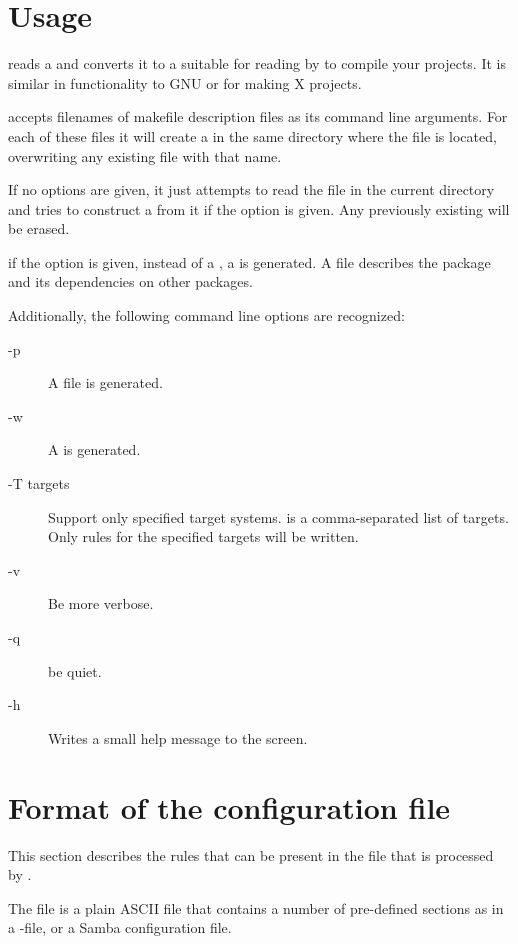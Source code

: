 \section{Usage}
 reads a  and converts it to a
 suitable for reading by \gnu {}
to compile your projects. It is similar in functionality to GNU
 or  for making X projects.

\fpcmake{} accepts filenames of makefile description files
as its command line arguments. For each of these files it will
create a  in the same directory where the file is
located, overwriting any existing file with that name.

If no options are given, it just attempts to read the file
 in the current directory and tries to
construct a  from it if the  option is
given. Any previously existing  will be erased.

if the  option is given, instead of a , a
 is generated. A  file describes the
package and its dependencies on other packages.

Additionally, the following command line options are recognized:
\begin{description}
\item[-p] A  file is generated.
\item[-w] A  is generated.
\item[-T targets] Support only specified target systems.  is a
comma-separated list of targets. Only rules for the specified targets
will be written.
\item[-v] Be more verbose.
\item[-q] be quiet.
\item[-h] Writes a small help message to the screen.
\end{description}

\section{Format of the configuration file}
This section describes the rules that can be present in the file
that is processed by \fpcmake{}.

The file  is a plain ASCII file that contains
a number of pre-defined sections as in a \windows {}-file,
or a Samba configuration file.

